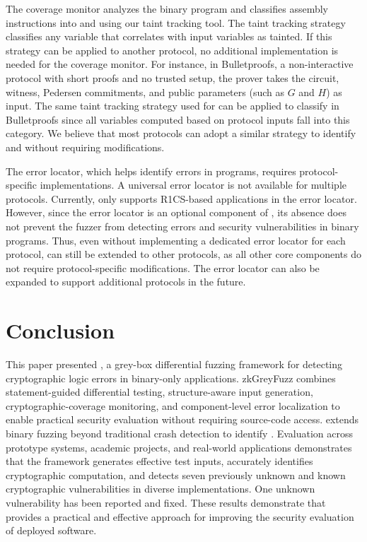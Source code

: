The coverage monitor analyzes the binary program and classifies assembly instructions into \cryptobranch and \programbranch using our taint tracking tool. The taint tracking strategy classifies any variable that correlates with input variables as tainted. If this strategy can be applied to another \zkp protocol, no additional implementation is needed for the coverage monitor. For instance, in Bulletproofs, a non-interactive \zkp protocol with short proofs and no trusted setup, the prover takes the circuit, witness, Pedersen commitments, and public parameters (such as $G$ and $H$) as input. The same taint tracking strategy used for \zksnark can be applied to classify \cryptobranch in Bulletproofs since all variables computed based on protocol inputs fall into this category. We believe that most \zkp protocols can adopt a similar strategy to identify \cryptobranch and \programbranch without requiring modifications.

The error locator, which helps identify errors in \zkp programs, requires protocol-specific implementations. A universal error locator is not available for multiple \zkp protocols. Currently, \greyboxfuzz only supports R1CS-based \zksnark applications in the error locator. However, since the error locator is an optional component of \greyboxfuzz, its absence does not prevent the fuzzer from detecting errors and security vulnerabilities in \zkp binary programs. Thus, even without implementing a dedicated error locator for each \zkp protocol, \greyboxfuzz can still be extended to other \zkp protocols, as all other core components do not require protocol-specific modifications. The error locator can also be expanded to support additional \zkp protocols in the future.

\section{Conclusion}
This paper presented \greyboxfuzz, a grey-box differential fuzzing framework for detecting cryptographic logic errors in binary-only \zksnark applications. zkGreyFuzz combines statement-guided differential testing, structure-aware input generation, cryptographic-coverage monitoring, and component-level error localization to enable practical security evaluation without requiring source-code access. \greyboxfuzz extends binary fuzzing beyond traditional crash detection to identify \logicerror. Evaluation across prototype systems, academic projects, and real-world \zksnark applications demonstrates that the framework generates effective test inputs, accurately identifies cryptographic computation, and detects seven previously unknown and known cryptographic vulnerabilities in diverse implementations. One unknown vulnerability has been reported and fixed. These results demonstrate that \greyboxfuzz provides a practical and effective approach for improving the security evaluation of deployed \zksnark software.